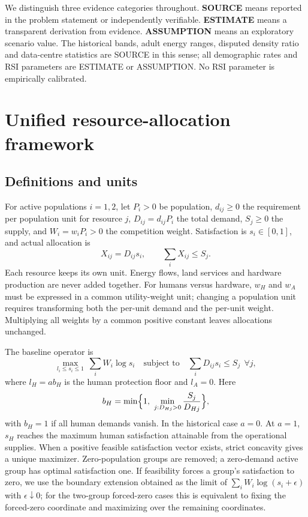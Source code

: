 \documentclass[11pt]{article}
\begin{document}
We distinguish three evidence categories throughout. \textbf{SOURCE} means reported in the problem statement or independently verifiable. \textbf{ESTIMATE} means a transparent derivation from evidence. \textbf{ASSUMPTION} means an exploratory scenario value. The historical bands, adult energy ranges, disputed density ratio and data-centre statistics are SOURCE in this sense; all demographic rates and RSI parameters are ESTIMATE or ASSUMPTION. No RSI parameter is empirically calibrated.

\section{Unified resource-allocation framework}

\subsection{Definitions and units}
For active populations $i=1,2$, let $P_i>0$ be population, $d_{ij}\ge 0$ the requirement per population unit for resource $j$, $D_{ij}=d_{ij}P_i$ the total demand, $S_j\ge 0$ the supply, and $W_i=w_iP_i>0$ the competition weight. Satisfaction is $s_i\in[0,1]$, and actual allocation is
\begin{equation}
X_{ij}=D_{ij}s_i,\qquad \sum_i X_{ij}\le S_j.
\label{eq:conservation}
\end{equation}
Each resource keeps its own unit. Energy flows, land services and hardware production are never added together. For humans versus hardware, $w_H$ and $w_A$ must be expressed in a common utility-weight unit; changing a population unit requires transforming both the per-unit demand and the per-unit weight. Multiplying all weights by a common positive constant leaves allocations unchanged.

The baseline operator is
\begin{equation}
\max_{l_i\le s_i\le 1}\ \sum_i W_i\log s_i
\quad\text{subject to}\quad \sum_i D_{ij}s_i\le S_j\ \ \forall j,
\label{eq:fair}
\end{equation}
where $l_H=a b_H$ is the human protection floor and $l_A=0$. Here
\begin{equation}
b_H=\min\Bigl\{1,\ \min_{j:D_{Hj}>0}\frac{S_j}{D_{Hj}}\Bigr\},
\label{eq:bH}
\end{equation}
with $b_H=1$ if all human demands vanish. In the historical case $a=0$. At $a=1$, $s_H$ reaches the maximum human satisfaction attainable from the operational supplies. When a positive feasible satisfaction vector exists, strict concavity gives a unique maximizer. Zero-population groups are removed; a zero-demand active group has optimal satisfaction one. If feasibility forces a group's satisfaction to zero, we use the boundary extension obtained as the limit of $\sum_iW_i\log(s_i+\epsilon)$ with $\epsilon\downarrow0$; for the two-group forced-zero cases this is equivalent to fixing the forced-zero coordinate and maximizing over the remaining coordinates.
\end{document}
